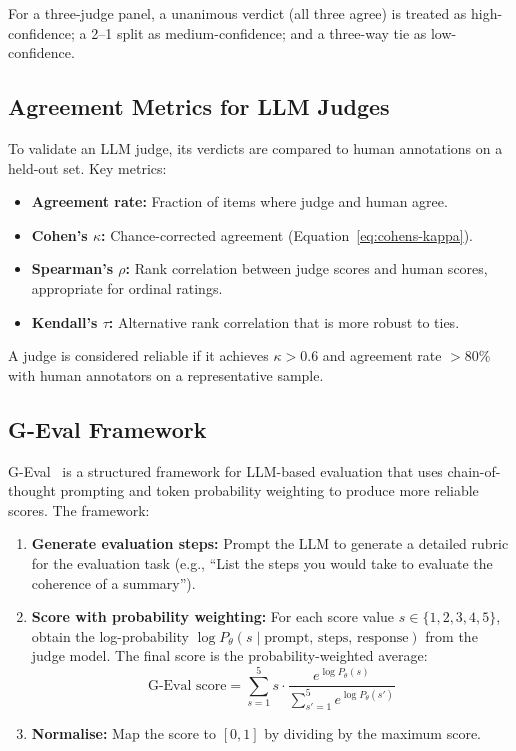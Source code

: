 For a three-judge panel, a unanimous verdict (all three agree) is treated as high-confidence; a 2--1 split as medium-confidence; and a three-way tie as low-confidence.

\subsection{Agreement Metrics for LLM Judges}
\label{agreement-metrics-for-llm-judges}

To validate an LLM judge, its verdicts are compared to human annotations on a held-out set. Key metrics:

\begin{itemize}
  \item \textbf{Agreement rate:} Fraction of items where judge and human agree.
  \item \textbf{Cohen’s $\kappa$:} Chance-corrected agreement (Equation~\ref{eq:cohens-kappa}).
  \item \textbf{Spearman’s $\rho$:} Rank correlation between judge scores and human scores, appropriate for ordinal ratings.
  \item \textbf{Kendall’s $\tau$:} Alternative rank correlation that is more robust to ties.
\end{itemize}

A judge is considered reliable if it achieves $\kappa > 0.6$ and agreement rate $> 80\%$ with human annotators on a representative sample.

\subsection{G-Eval Framework}
\label{g-eval-framework}

G-Eval~\cite{liu2023geval} is a structured framework for LLM-based evaluation that uses chain-of-thought prompting and token probability weighting to produce more reliable scores. The framework:

\begin{enumerate}
  \item \textbf{Generate evaluation steps:} Prompt the LLM to generate a detailed rubric for the evaluation task (e.g., ``List the steps you would take to evaluate the coherence of a summary'').
  \item \textbf{Score with probability weighting:} For each score value $s \in \{1, 2, 3, 4, 5\}$, obtain the log-probability $\log P_\theta(s \mid \text{prompt, steps, response})$ from the judge model. The final score is the probability-weighted average: 
\begin{equation}
        \text{G-Eval score} = \sum_{s=1}^{5} s \cdot \frac{e^{\log P_\theta(s)}}{\sum_{s'=1}^{5} e^{\log P_\theta(s')}}
\end{equation}
  \item \textbf{Normalise:} Map the score to $[0, 1]$ by dividing by the maximum score.
\end{enumerate}

